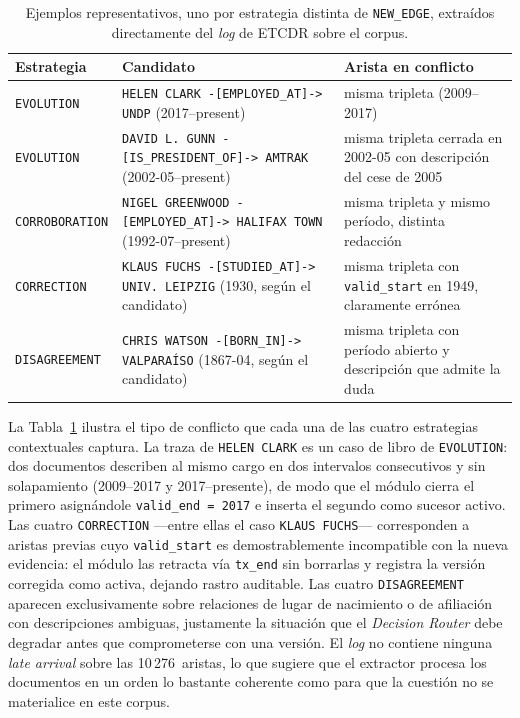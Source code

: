 \begin{table}[h]
\centering
\footnotesize
\begin{tabular}{p{1.7cm}p{6.0cm}p{6.0cm}}
\hline
\textbf{Estrategia} & \textbf{Candidato} & \textbf{Arista en conflicto} \\ \hline
\texttt{EVOLUTION} & \texttt{HELEN CLARK -[EMPLOYED\_AT]-> UNDP} \newline (2017--present) & misma tripleta (2009--2017) \\
\texttt{EVOLUTION} & \texttt{DAVID L. GUNN -[IS\_PRESIDENT\_OF]-> AMTRAK} \newline (2002-05--present) & misma tripleta cerrada en 2002-05 con descripción del cese de 2005 \\
\texttt{CORROBORATION} & \texttt{NIGEL GREENWOOD -[EMPLOYED\_AT]-> HALIFAX TOWN} \newline (1992-07--present) & misma tripleta y mismo período, distinta redacción \\
\texttt{CORRECTION} & \texttt{KLAUS FUCHS -[STUDIED\_AT]-> UNIV.\ LEIPZIG} \newline (1930, según el candidato) & misma tripleta con \texttt{valid\_start} en 1949, claramente errónea \\
\texttt{DISAGREEMENT} & \texttt{CHRIS WATSON -[BORN\_IN]-> VALPARAÍSO} \newline (1867-04, según el candidato) & misma tripleta con período abierto y descripción que admite la duda \\ \hline
\end{tabular}
\caption{Ejemplos representativos, uno por estrategia distinta de \texttt{NEW\_EDGE}, extraídos directamente del \emph{log} de ETCDR sobre el corpus.}
\label{tab:eval-ragtest-etcdr-samples}
\end{table}

La Tabla~\ref{tab:eval-ragtest-etcdr-samples} ilustra el tipo de conflicto que cada una de las cuatro estrategias contextuales captura. La traza de \texttt{HELEN CLARK} es un caso de libro de \texttt{EVOLUTION}: dos documentos describen al mismo cargo en dos intervalos consecutivos y sin solapamiento (2009--2017 y 2017--presente), de modo que el módulo cierra el primero asignándole \texttt{valid\_end~=~2017} e inserta el segundo como sucesor activo. Las cuatro \texttt{CORRECTION} ---entre ellas el caso \texttt{KLAUS FUCHS}--- corresponden a aristas previas cuyo \texttt{valid\_start} es demostrablemente incompatible con la nueva evidencia: el módulo las retracta vía \texttt{tx\_end} sin borrarlas y registra la versión corregida como activa, dejando rastro auditable. Las cuatro \texttt{DISAGREEMENT} aparecen exclusivamente sobre relaciones de lugar de nacimiento o de afiliación con descripciones ambiguas, justamente la situación que el \emph{Decision Router} debe degradar antes que comprometerse con una versión. El \emph{log} no contiene ninguna \emph{late arrival} sobre las 10\,276~aristas, lo que sugiere que el extractor procesa los documentos en un orden lo bastante coherente como para que la cuestión no se materialice en este corpus.

